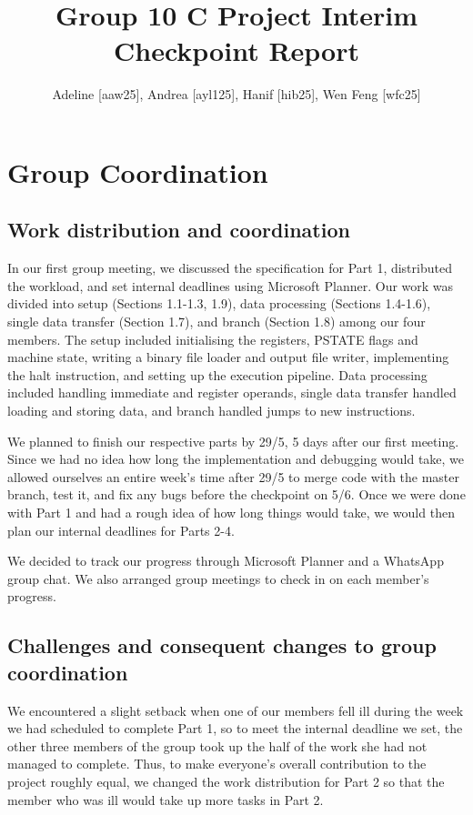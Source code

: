 \documentclass{article}
\title{Group 10 C Project Interim Checkpoint Report}
\author{Adeline [aaw25], Andrea [ayl125], Hanif [hib25], Wen Feng [wfc25]}
\begin{document}
\maketitle

\section{Group Coordination}
\subsection{Work distribution and coordination}
In our first group meeting, we discussed the specification for Part 1, distributed the workload, and set internal deadlines using Microsoft Planner. Our work was divided into setup (Sections 1.1-1.3, 1.9), data processing (Sections 1.4-1.6), single data transfer (Section 1.7), and branch (Section 1.8) among our four members. The setup included initialising the registers, PSTATE flags and machine state, writing a binary file loader and output file writer, implementing the halt instruction, and setting up the execution pipeline. Data processing included handling immediate and register operands, single data transfer handled loading and storing data, and branch handled jumps to new instructions. \newline

We planned to finish our respective parts by 29/5, 5 days after our first meeting. Since we had no idea how long the implementation and debugging would take, we allowed ourselves an entire week's time after 29/5 to merge code with the master branch, test it, and fix any bugs before the checkpoint on 5/6. Once we were done with Part 1 and had a rough idea of how long things would take, we would then plan our internal deadlines for Parts 2-4. \newline

We decided to track our progress through Microsoft Planner and a WhatsApp group chat. We also arranged group meetings to check in on each member's progress.

\subsection{Challenges and consequent changes to group coordination}
We encountered a slight setback when one of our members fell ill during the week we had scheduled to complete Part 1, so to meet the internal deadline we set, the other three members of the group took up the half of the work she had not managed to complete. Thus, to make everyone's overall contribution to the project roughly equal, we changed the work distribution for Part 2 so that the member who was ill would take up more tasks in Part 2.
\end{document}
